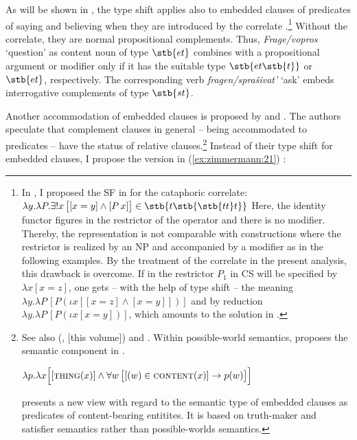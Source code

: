 \documentclass[output=paper]{langscibook}
\begin{document}
As will be shown in , the type shift  applies also to embedded clauses of predicates of saying and believing when they are introduced by the correlate \citep{Zimmermann2016b,Zimmermann2016a, Zimmermann2019a}.\footnote{In \citet[33]{Zimmermann2016a}, I proposed the SF in  for the cataphoric correlate:
\ea\label{ex:zimmermann:cc} $\lambda y . \lambda P .\exists!x \, \big[[x = y] \wedge [P \, x]\big] \in \stb{t\stb{{\stb{tt} t}}}$ \z
Here, the identity functor figures in the restrictor of the operator and there is no modifier. Thereby, the representation is not comparable with constructions where the restrictor is realized by an NP and accompanied by a modifier as in the following examples. By the treatment of the correlate in the present analysis, this drawback is overcome. If in  the restrictor $P_1$ in CS will be specified by $\lambda x [x = z]$, one gets -- with the help of type shift  -- the meaning $\lambda y . \lambda P \, [P (\iota x[[x = z] \wedge [x = y]])]$ and by reduction $\lambda y . \lambda P \, [P (\iota x [x = y])]$, which amounts to the solution in \citet[33]{Zimmermann2016a}.}
Without the correlate, they are normal propositional complements. Thus, \textit{Frage/vopros} `question' as content noun of type $\stb{et}$ combines with a propositional argument or modifier only if it has the suitable type $\stb{et\stb{t}}$ or $\stb{et}$, respectively. The corresponding verb \textit{fragen/sprašivat'} `ask' embeds interrogative complements of type $\stb{st}$.


\label{s:2.4.1.2}

Another accommodation of embedded clauses is proposed by \citet{Kratzer2006,Kratzer2015,Kratzer2016,Moulton2014,Moulton2015,Moulton2017,Hanink2016} and \citet{Bogal-AllbrittenMoulton2018}. The authors speculate that complement clauses in general -- being accommodated to predicates -- have the status of relative clauses.\footnote{\label{fn:possibleworlds}See also \citeauthor{Arsenijevic2009} (\citeyear{Arsenijevic2009}, \citeyear{Arsenijevic2021} [this volume]) and \citet{CaponigroPolinsky2011}. Within possible-world semantics, \citet{Kratzer2016} proposes the semantic component in .

\ea\label{ex:zimmermann:fn28} $\lambda p . \lambda x \Big[[\textsc{thing} (x)] \wedge \forall w \, \big[[{(w)} \in \textsc{content} (x)] \rightarrow p(w)\big]\Big]$ \z

\noindent \citet{Moltmann2020} presents a new view with regard to the semantic type of embedded clauses as predicates of content-bearing entitites. It is based on truth-maker and satisfier semantics rather than possible-worlds semantics.} Instead of their type shift for embedded clauses, I propose the version in (\ref{ex:zimmermann:21}) \citep[see][]{Zimmermann2016b,Zimmermann2018a,Zimmermann2019a,Zimmermann2019c}:
\end{document}
